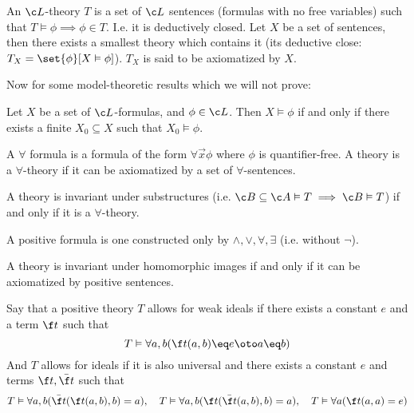 \edefn

\bdefn

    An $\c L$-theory $T$ is a set of $\c L$ sentences (formulas with no free variables) such that $T\vDash\phi\implies\phi\in T$.
    I.e. it is deductively closed.
    Let $X$ be a set of sentences, then there exists a smallest theory which contains it (its deductive close: $T_X=\set{\phi}[X\vDash\phi]$).
    $T_X$ is said to be {\emphcolor axiomatized} by $X$.

\edefn

Now for some model-theoretic results which we will not prove:

\bthrm[title=The Compactness Theorem]

    Let $X$ be a set of $\c L$-formulas, and $\phi\in\c L$.
    Then $X\vDash\phi$ if and only if there exists a finite $X_0\subseteq X$ such that $X_0\vDash\phi$.

\ethrm

\bdefn

    A {\emphcolor $\forall$ formula} is a formula of the form $\forall\vec x\phi$ where $\phi$ is quantifier-free.
    A theory is a $\forall$-theory if it can be axiomatized by a set of $\forall$-sentences.

\edefn

\bthrm

    A theory is invariant under substructures (i.e. $\c B\subseteq\c A\vDash T\implies\c B\vDash T$) if and only if it is a $\forall$-theory.

\ethrm

\bdefn

    A {\emphcolor positive formula} is one constructed only by $\land,\lor,\forall,\exists$ (i.e. without $\neg$).

\edefn

\bthrm

    A theory is invariant under homomorphic images if and only if it can be axiomatized by positive sentences.

\ethrm

\bdefn

    Say that a positive theory $T$ {\emphcolor allows for weak ideals} if there exists a constant $e$ and a term $\f t$ such that
    $$ T\vDash\forall a,b(\f t(a,b)\eq e\oto a\eq b) $$
    And $T$ {\emphcolor allows for ideals} if it is also universal and there exists a constant $e$ and terms $\f t,\bar{\f t}$ such that
    $$ T\vDash\forall a,b(\bar{\f t}(\f t(a,b),b)=a),\quad T\vDash\forall a,b(\f t(\bar{\f t}(a,b),b)=a),\quad T\vDash\forall a(\f t(a,a)=e) $$

